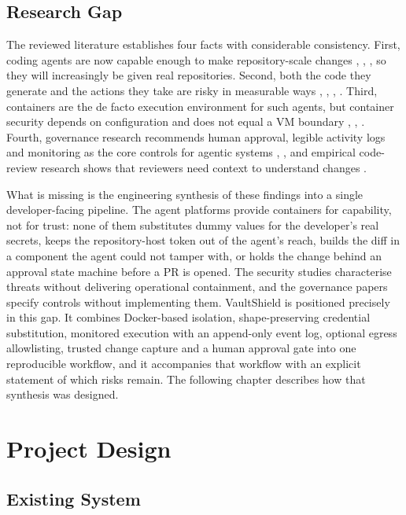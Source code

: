 \documentclass[12pt,a4paper,oneside]{report}
\begin{document}
\endgroup

\section{Research Gap}\label{research-gap}

The reviewed literature establishes four facts with considerable consistency. First, coding agents are now capable enough to make repository-scale changes \cite{ref2}, \cite{ref3}, \cite{ref4}, so they will increasingly be given real repositories. Second, both the code they generate and the actions they take are risky in measurable ways \cite{ref5}, \cite{ref6}, \cite{ref7}, \cite{ref8}. Third, containers are the de facto execution environment for such agents, but container security depends on configuration and does not equal a VM boundary \cite{ref11}, \cite{ref12}, \cite{ref13}. Fourth, governance research recommends human approval, legible activity logs and monitoring as the core controls for agentic systems \cite{ref9}, \cite{ref10}, and empirical code-review research shows that reviewers need context to understand changes \cite{ref14}.

What is missing is the engineering synthesis of these findings into a single developer-facing pipeline. The agent platforms provide containers for capability, not for trust: none of them substitutes dummy values for the developer's real secrets, keeps the repository-host token out of the agent's reach, builds the diff in a component the agent could not tamper with, or holds the change behind an approval state machine before a PR is opened. The security studies characterise threats without delivering operational containment, and the governance papers specify controls without implementing them. VaultShield is positioned precisely in this gap. It combines Docker-based isolation, shape-preserving credential substitution, monitored execution with an append-only event log, optional egress allowlisting, trusted change capture and a human approval gate into one reproducible workflow, and it accompanies that workflow with an explicit statement of which risks remain. The following chapter describes how that synthesis was designed.

\clearpage

\chapter{Project Design}\label{project-design}

\section{Existing System}\label{existing-system}
\end{document}
